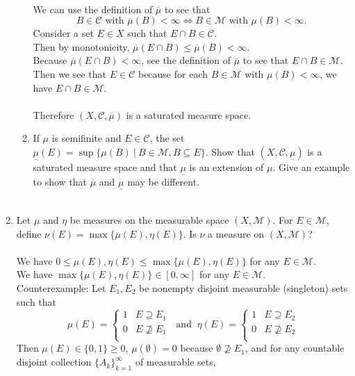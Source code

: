\begin{enumerate}
\begin{enumerate}[label=(\roman*),align=left]
		\\We can use the definition of $\overline\mu$ to see that 
		\[
			B\in\mathcal{C}\text{ with }\overline\mu(B)<\infty\iff B\in\mathcal{M}\text{ with }\mu(B)<\infty.
		\]
		Consider a set $E\in X$ such that $E\cap B\in\mathcal{C}$.
		\\Then by monotonicity, $\overline\mu(E\cap B)\le \overline\mu(B)<\infty$.
		\\Because $\overline\mu(E\cap B)<\infty$, see the definition of $\overline\mu$ to see that $E\cap B\in\mathcal{M}$.
		\\Then we see that $E\in\mathcal{C}$ because for each $B\in\mathcal{M}$ with $\mu(B)<\infty$, we have $E\cap B\in\mathcal{M}$.\\
		\\Therefore $(X,\mathcal{C},\overline\mu)$ is a saturated measure space.
		\item If $\mu$ is semifinite and $E\in\mathcal{C}$, the set $\underline\mu(E)=\sup\{\mu(B)\ |\ B\in\mathcal{M},B\subseteq E\}$.
		Show that $(X,\mathcal{C},\underline\mu)$ is a saturated measure space and that $\underline\mu$ is an extension of $\mu$.
		Give an example to show that $\overline\mu$ and $\underline\mu$ may be different.\\
		\\
	\end{enumerate}
	\item Let $\mu$ and $\eta$ be measures on the measurable space $(X,\mathcal{M})$.
	For $E\in\mathcal{M}$, define $\nu(E)=\max\{\mu(E),\eta(E)\}$. Is $\nu$ a measure on $(X,\mathcal{M})$?\\
	\\We have $0\le\mu(E),\eta(E)\le\max\{\mu(E),\eta(E)\}$ for any $E\in\mathcal{M}$.
	\\We have $\max\{\mu(E),\eta(E)\}\in[0,\infty]$ for any $E\in\mathcal{M}$.
	\\Counterexample:
	Let $E_1,E_2$ be nonempty disjoint measurable (singleton) sets such that
	\[
		\mu(E)=
		\begin{cases}
			1&E\supseteq E_1\\
			0&E\not\supseteq E_1\\
		\end{cases}
		\ \text{ and }\ \eta(E)=
		\begin{cases}
			1&E\supseteq E_2\\
			0&E\not\supseteq E_2\\
		\end{cases}
	\]
	Then $\mu(E)\in\{0,1\}\ge0$, $\mu(\emptyset)=0$ because $\emptyset\not\supseteq E_1$, and for any countable disjoint collection $\{A_k\}_{k=1}^\infty$ of measurable sets,

\end{enumerate}
